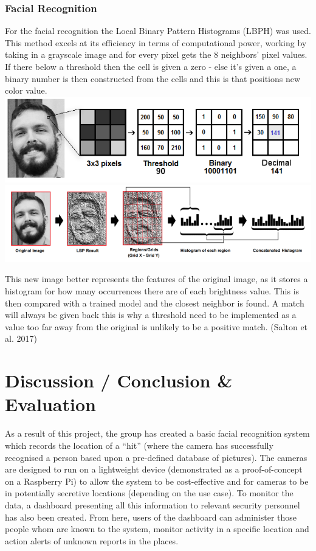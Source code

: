 \documentclass[
  english,
  a4paper,
,tablecaptionabove
]{scrartcl}
\begin{document}
\hypertarget{facial-recognition}{%
\subsubsection{Facial Recognition}\label{facial-recognition}}

For the facial recognition the Local Binary Pattern Histograms (LBPH)
was used. This method excels at its efficiency in terms of computational
power, working by taking in a grayscale image and for every pixel gets
the 8 neighbors' pixel values. If there below a threshold then the cell
is given a zero - else it's given a one, a binary number is then
constructed from the cells and this is that positions new color value.
\includegraphics{images/ppm-images/camera-algorithm3.png}
\includegraphics{images/ppm-images/camera-algorithm4.png}

This new image better represents the features of the original image, as
it stores a histogram for how many occurrences there are of each
brightness value. This is then compared with a trained model and the
closest neighbor is found. A match will always be given back this is why
a threshold need to be implemented as a value too far away from the
original is unlikely to be a positive match. (Salton et al. 2017)

\newpage

\hypertarget{discussion-conclusion-evaluation}{%
\section{Discussion / Conclusion \&
Evaluation}\label{discussion-conclusion-evaluation}}

As a result of this project, the group has created a basic facial
recognition system which records the location of a \enquote{hit} (where
the camera has successfully recognised a person based upon a pre-defined
database of pictures). The cameras are designed to run on a lightweight
device (demonstrated as a proof-of-concept on a Raspberry Pi) to allow
the system to be cost-effective and for cameras to be in potentially
secretive locations (depending on the use case). To monitor the data, a
dashboard presenting all this information to relevant security personnel
has also been created. From here, users of the dashboard can administer
those people whom are known to the system, monitor activity in a
specific location and action alerts of unknown reports in the places.
\end{document}
